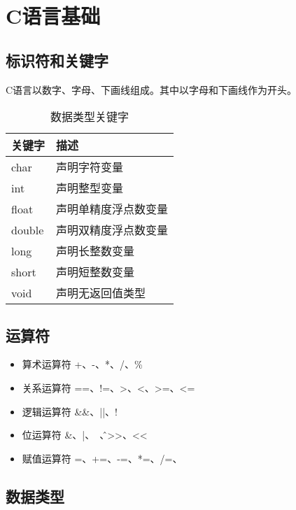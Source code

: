 \section{C语言基础}


\subsection{标识符和关键字}
C语言以数字、字母、下画线组成。其中以字母和下画线作为开头。

\begin{table}
    \centering
    \caption{数据类型关键字}
    \begin{tabular}{ll}
        \toprule
        关键字 & 描述 \\
		\midrule
        char & 声明字符变量 \\
        int & 声明整型变量 \\
        float & 声明单精度浮点数变量 \\
        double & 声明双精度浮点数变量\\
        long & 声明长整数变量 \\
        short & 声明短整数变量 \\
        void & 声明无返回值类型 \\
		\bottomrule
	\end{tabular}
\end{table}


\subsection{运算符}

\begin{itemize}
	\item 算术运算符 +、-、*、/、\%
	\item 关系运算符 ==、!=、>、<、>=、<=
	\item 逻辑运算符 \&\&、||、!
	\item 位运算符 \&、|、~、\^、>>、<<
	\item 赋值运算符 =、+=、-=、*=、/=、%
\end{itemize}



\subsection{数据类型}

